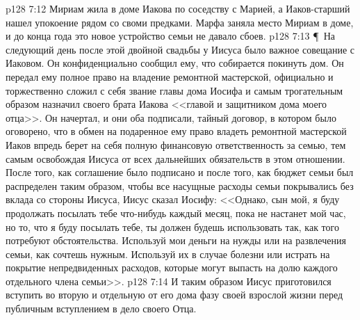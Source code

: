 \vs p128 7:12 Мириам жила в доме Иакова по соседству с Марией, а Иаков\hyp{}старший нашел упокоение рядом со своми предками. Марфа заняла место Мириам в доме, и до конца года это новое устройство семьи не давало сбоев.
\vs p128 7:13 \P\ На следующий день после этой двойной свадьбы у Иисуса было важное совещание с Иаковом. Он конфиденциально сообщил ему, что собирается покинуть дом. Он передал ему полное право на владение ремонтной мастерской, официально и торжественно сложил с себя звание главы дома Иосифа и самым трогательным образом назначил своего брата Иакова <<главой и защитником дома моего отца>>. Он начертал, и они оба подписали, тайный договор, в котором было оговорено, что в обмен на подаренное ему право владеть ремонтной мастерской Иаков впредь берет на себя полную финансовую ответственность за семью, тем самым освобождая Иисуса от всех дальнейших обязательств в этом отношении. После того, как соглашение было подписано и после того, как бюджет семьи был распределен таким образом, чтобы все насущные расходы семьи покрывались без вклада со стороны Иисуса, Иисус сказал Иосифу: <<Однако, сын мой, я буду продолжать посылать тебе что\hyp{}нибудь каждый месяц, пока не настанет мой час, но то, что я буду посылать тебе, ты должен будешь использовать так, как того потребуют обстоятельства. Используй мои деньги на нужды или на развлечения семьи, как сочтешь нужным. Используй их в случае болезни или истрать на покрытие непредвиденных расходов, которые могут выпасть на долю каждого отдельного члена семьи>>.
\vs p128 7:14 И таким образом Иисус приготовился вступить во вторую и отдельную от его дома фазу своей взрослой жизни перед публичным вступлением в дело своего Отца.

